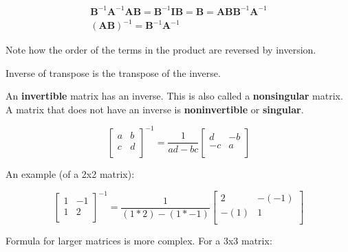 \documentclass[a4paper,12pt]{article}
\newcommand{\matr}[1]{\mathbf{#1}}
\begin{document}
\begin{align*}
\matr{B}^{-1}\matr{A}^{-1}\matr{A}\matr{B} = \matr{B}^{-1}\matr{I}\matr{B} = \matr{B} = \matr{A}\matr{B}\matr{B}^{-1}\matr{A}^{-1}\\
(\matr{A}\matr{B})^{-1} = \matr{B}^{-1}\matr{A}^{-1}
\end{align*}

Note how the order of the terms in the product are reversed by inversion.

Inverse of transpose is the transpose of the inverse.



An \textbf{invertible} matrix has an inverse. This is also called a \textbf{nonsingular} matrix. A matrix that does not have an inverse is \textbf{noninvertible} or \textbf{singular}.


\begin{equation*}
\begin{bmatrix}
 a & b \\
 c & d \\
\end{bmatrix}^{-1} = 
\dfrac{1}{ad-bc}
\begin{bmatrix}
 d & -b \\
 -c & a \\
\end{bmatrix}
\end{equation*}


An example (of a 2x2 matrix):

\begin{equation*}
\begin{bmatrix}
 1 & -1 \\
 1 & 2 \\
\end{bmatrix}^{-1} = 
\dfrac{1}{(1*2)-(1*-1)}
\begin{bmatrix}
 2 & -(-1) \\
 -(1) & 1 \\
\end{bmatrix}
\end{equation*}





Formula for larger matrices is more complex. For a 3x3 matrix:
\end{document}
